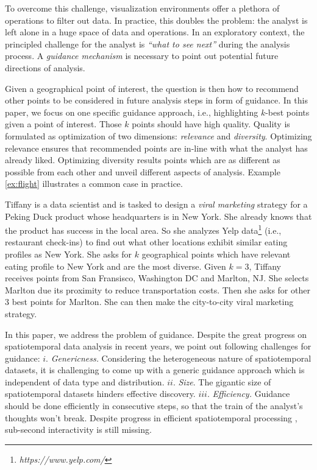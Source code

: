 To overcome this challenge, visualization environments offer a plethora of operations to filter out data. In practice, this doubles the problem: the analyst is left alone in a huge space of data and operations. 
In an exploratory context,
the principled challenge for the analyst is {\em ``what to see next''} during the analysis process. A {\em guidance mechanism} is necessary to point out potential future directions of analysis.

Given a geographical point of interest, the question is then how to recommend other points to be considered in future analysis steps in form of guidance. In this paper, we focus on one specific guidance approach, i.e., highlighting $k$-best points given a point of interest. Those $k$ points should have high quality. Quality is formulated as optimization of two dimensions: {\em relevance} and {\em diversity}. Optimizing relevance ensures that recommended points are in-line with what the analyst has already liked. Optimizing diversity results points which are as different as possible from each other and unveil different aspects of analysis. Example \ref{ex:flight} illustrates a common case in practice.

\begin{example}
\label{ex:flight}
Tiffany is a data scientist and is tasked to design a {\em viral marketing} strategy for a Peking Duck product whose headquarters is in New York. She already knows that the product has success in the local area. So she analyzes Yelp data\footnote{\it https://www.yelp.com/} (i.e., restaurant check-ins) to find out what other locations exhibit similar eating profiles as New York. She asks for $k$ geographical points which have relevant eating profile to New York and are the most diverse. Given $k=3$, Tiffany receives points from San Fransisco, Washington DC and Marlton, NJ. She selects Marlton due its proximity to reduce transportation costs. Then she asks for other 3 best points for Marlton. She can then make the city-to-city viral marketing strategy.
\end{example}

In this paper, we address the problem of guidance. Despite the great progress on spatiotemporal data analysis in recent years, we point out following challenges for guidance:
$i.$ {\em Genericness.} Considering the heterogeneous nature of spatiotemporal datasets, it is challenging to come up with a generic guidance approach which is independent of data type and distribution.
$ii.$ {\em Size}. The gigantic size of spatiotemporal datasets hinders effective discovery. 
$iii.$ {\em Efficiency.} Guidance should be done efficiently in consecutive steps, so that the train of the analyst's thoughts won't break. Despite progress in efficient spatiotemporal processing \cite{yu2015geospark}, sub-second interactivity is still missing.

